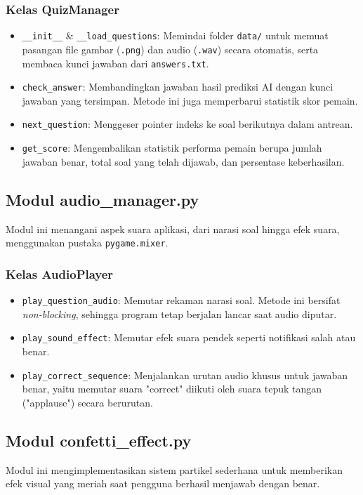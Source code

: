 \subsubsection{Kelas QuizManager}
\begin{itemize}
    \item \texttt{\_\_init\_\_} \& \texttt{\_\_load\_questions}: Memindai folder \texttt{data/} untuk memuat pasangan file gambar (\texttt{.png}) dan audio (\texttt{.wav}) secara otomatis, serta membaca kunci jawaban dari \texttt{answers.txt}.
    \item \texttt{check\_answer}: Membandingkan jawaban hasil prediksi AI dengan kunci jawaban yang tersimpan. Metode ini juga memperbarui statistik skor pemain.
    \item \texttt{next\_question}: Menggeser pointer indeks ke soal berikutnya dalam antrean.
    \item \texttt{get\_score}: Mengembalikan statistik performa pemain berupa jumlah jawaban benar, total soal yang telah dijawab, dan persentase keberhasilan.
\end{itemize}

\subsection{Modul audio\_manager.py}
Modul ini menangani aspek suara aplikasi, dari narasi soal hingga efek suara, menggunakan pustaka \texttt{pygame.mixer}.

\subsubsection{Kelas AudioPlayer}
\begin{itemize}
    \item \texttt{play\_question\_audio}: Memutar rekaman narasi soal. Metode ini bersifat \textit{non-blocking}, sehingga program tetap berjalan lancar saat audio diputar.
    \item \texttt{play\_sound\_effect}: Memutar efek suara pendek seperti notifikasi salah atau benar.
    \item \texttt{play\_correct\_sequence}: Menjalankan urutan audio khusus untuk jawaban benar, yaitu memutar suara "correct" diikuti oleh suara tepuk tangan ("applause") secara berurutan.
\end{itemize}

\subsection{Modul confetti\_effect.py}
Modul ini mengimplementasikan sistem partikel sederhana untuk memberikan efek visual yang meriah saat pengguna berhasil menjawab dengan benar.

